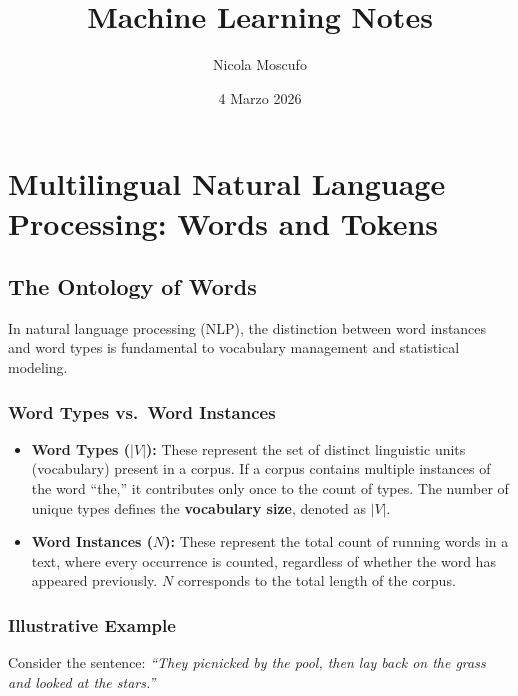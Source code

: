 \documentclass[
  italian,
  11pt,
]{article}
\title{Machine Learning Notes}
\author{Nicola Moscufo}
\date{4 Marzo 2026}
\providecommand{\tightlist}{%
  \setlength{\itemsep}{0pt}\setlength{\parskip}{0pt}}
\begin{document}
\maketitle

{
\hypersetup{linkcolor=Black}
\setcounter{tocdepth}{3}
\tableofcontents
}
\section{Multilingual Natural Language Processing: Words and
Tokens}\label{multilingual-natural-language-processing-words-and-tokens}

\subsection{The Ontology of Words}\label{the-ontology-of-words}

In natural language processing (NLP), the distinction between word
instances and word types is fundamental to vocabulary management and
statistical modeling.

\subsubsection{Word Types vs.~Word
Instances}\label{word-types-vs.-word-instances}

\begin{itemize}
\tightlist
\item
  \textbf{Word Types (\(|V|\)):} These represent the set of distinct
  linguistic units (vocabulary) present in a corpus. If a corpus
  contains multiple instances of the word ``the,'' it contributes only
  once to the count of types. The number of unique types defines the
  \textbf{vocabulary size}, denoted as \(|V|\).
\item
  \textbf{Word Instances (\(N\)):} These represent the total count of
  running words in a text, where every occurrence is counted, regardless
  of whether the word has appeared previously. \(N\) corresponds to the
  total length of the corpus.
\end{itemize}

\subsubsection{Illustrative Example}\label{illustrative-example}

Consider the sentence: \emph{``They picnicked by the pool, then lay back
on the grass and looked at the stars.''}
\end{document}
